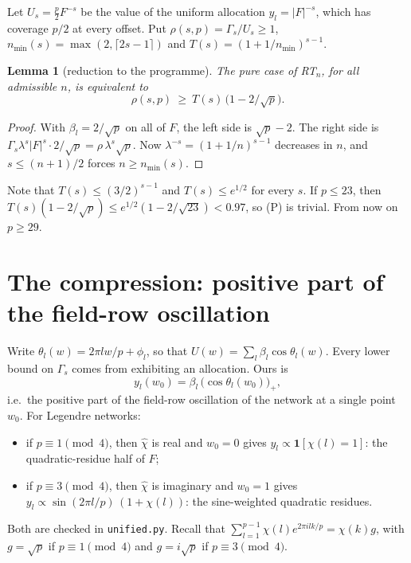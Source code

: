 \documentclass[11pt]{article}
\newtheorem{lemma}[theorem]{Lemma}
\theoremstyle{remark}\newtheorem{remark}[theorem]{Remark}
\begin{document}
Let $U_s=\tfrac p2 F^{-s}$ be the value of the uniform allocation $y_l=|F|^{-s}$, which has coverage $p/2$ at every offset.
Put $\rho(s,p)=\Gamma_s/U_s\ge1$, $n_{\min}(s)=\max(2,\lceil 2s-1\rceil)$ and $T(s)=(1+1/n_{\min})^{s-1}$.

\begin{lemma}[reduction to the programme]
The pure case of RT$_n$, for all admissible $n$, is equivalent to
\[\rho(s,p)\ \ge\ T(s)\,\big(1-2/\sqrt p\big).\tag{P}\]
\end{lemma}
\begin{proof}
With $\beta_l=2/\sqrt p$ on all of $F$, the left side is $\sqrt p-2$. The right side is
$\Gamma_s\lambda^s|F|^s\cdot 2/\sqrt p=\rho\,\lambda^s\sqrt p$. Now $\lambda^{-s}=(1+1/n)^{s-1}$ decreases in $n$, and
$s\le(n+1)/2$ forces $n\ge n_{\min}(s)$.
\end{proof}

Note that $T(s)\le(3/2)^{s-1}$ and $T(s)\le e^{1/2}$ for every $s$. If $p\le23$, then
$T(s)(1-2/\sqrt p)\le e^{1/2}(1-2/\sqrt{23})<0.97$, so (P) is trivial. From now on $p\ge29$.

\section{The compression: positive part of the field-row oscillation}

Write $\theta_l(w)=2\pi lw/p+\phi_l$, so that $U(w)=\sum_l\beta_l\cos\theta_l(w)$. Every lower bound on $\Gamma_s$ comes
from exhibiting an allocation. Ours is
\[ y_l(w_0)=\beta_l\,\big(\cos\theta_l(w_0)\big)_+ ,\]
i.e.\ the positive part of the field-row oscillation of the network at a single point $w_0$. For Legendre networks:
\begin{itemize}
\item if $p\equiv1\pmod4$, then $\hat\chi$ is real and $w_0=0$ gives $y_l\propto\mathbf 1[\chi(l)=1]$: the quadratic-residue
half of $F$;
\item if $p\equiv3\pmod4$, then $\hat\chi$ is imaginary and $w_0=1$ gives $y_l\propto\sin(2\pi l/p)\,(1+\chi(l))$: the
sine-weighted quadratic residues.
\end{itemize}
Both are checked in \texttt{unified.py}. Recall that $\sum_{l=1}^{p-1}\chi(l)e^{2\pi ilk/p}=\chi(k)g$, with $g=\sqrt p$ if
$p\equiv1\pmod 4$ and $g=i\sqrt p$ if $p\equiv3\pmod4$.
\end{document}

